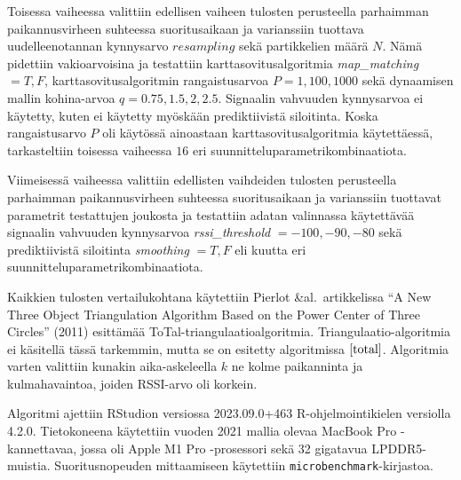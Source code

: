 \documentclass[
  12pt,
  a4paper, twoside]{book}
\begin{document}
Toisessa vaiheessa valittiin edellisen vaiheen tulosten perusteella parhaimman paikannusvirheen suhteessa suoritusaikaan ja varianssiin tuottava uudelleenotannan kynnysarvo \(resampling\) sekä partikkelien määrä \(N\). Nämä pidettiin vakioarvoisina ja testattiin karttasovitusalgoritmia \emph{map\_matching} \(={T,F}\), karttasovitusalgoritmin rangaistusarvoa \(P={1,100,1000}\) sekä dynaamisen mallin kohina-arvoa \(q={0.75,1.5,2,2.5}\). Signaalin vahvuuden kynnysarvoa ei käytetty, kuten ei käytetty myöskään prediktiivistä siloitinta. Koska rangaistusarvo \(P\) oli käytössä ainoastaan karttasovitusalgoritmia käytettäessä, tarkasteltiin toisessa vaiheessa \(16\) eri suunnitteluparametrikombinaatiota.

Viimeisessä vaiheessa valittiin edellisten vaihdeiden tulosten perusteella parhaimman paikannusvirheen suhteessa suoritusaikaan ja varianssiin tuottavat parametrit testattujen joukosta ja testattiin adatan valinnassa käytettävää signaalin vahvuuden kynnysarvoa \emph{rssi\_threshold} \(={-100,-90,-80}\) sekä prediktiivistä siloitinta \emph{smoothing} \(={T,F}\) eli kuutta eri suunnitteluparametrikombinaatiota.

Kaikkien tulosten vertailukohtana käytettiin Pierlot \&al.~artikkelissa ``A New Three Object Triangulation Algorithm Based on the Power Center of Three Circles'' (2011) esittämää ToTal-triangulaatioalgoritmia. \citep{Pierlot-2011} Triangulaatio-algoritmia ei käsitellä tässä tarkemmin, mutta se on esitetty algoritmissa \(\ref{total}\). Algoritmia varten valittiin kunakin aika-askeleella \(k\) ne kolme paikanninta ja kulmahavaintoa, joiden RSSI-arvo oli korkein.

Algoritmi ajettiin RStudion versiossa 2023.09.0+463 R-ohjelmointikielen versiolla 4.2.0. Tietokoneena käytettiin vuoden 2021 mallia olevaa MacBook Pro -kannettavaa, jossa oli Apple M1 Pro -prosessori sekä 32 gigatavua LPDDR5-muistia. Suoritusnopeuden mittaamiseen käytettiin \texttt{microbenchmark}-kirjastoa.
\end{document}
